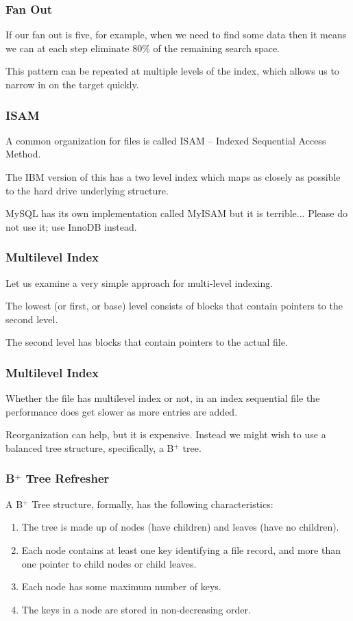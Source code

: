 \begin{frame}
\frametitle{Fan Out}

If our fan out is five, for example, when we need to find some data then it means we can at each step eliminate 80\% of the remaining search space.

This pattern can be repeated at multiple levels of the index, which allows us to narrow in on the target quickly.

\end{frame}

\begin{frame}
\frametitle{ISAM}

A common organization for files is called ISAM -- Indexed Sequential Access Method. 

The IBM version of this has a two level index which maps as closely as possible to the hard drive underlying structure. 

MySQL has its own implementation called MyISAM but it is terrible... Please do not use it; use InnoDB instead. 

\end{frame}

\begin{frame}
\frametitle{Multilevel Index}
Let us examine a very simple approach for multi-level indexing. 

The lowest (or first, or base) level consists of blocks that contain pointers to the second level. 

The second level has blocks that contain pointers to the actual file. 


\end{frame}

\begin{frame}
\frametitle{Multilevel Index}
Whether the file has multilevel index or not, in an index sequential file the performance does get slower as more entries are added. 

Reorganization can help, but it is expensive. Instead we might wish to use a balanced tree structure, specifically, a B$^{+}$ tree.


\end{frame}

\begin{frame}
\frametitle{B$^{+}$ Tree Refresher}

A B$^{+}$ Tree structure, formally, has the following characteristics:

\begin{enumerate}
	\item The tree is made up of nodes (have children) and leaves (have no children).
	\item Each node contains at least one key identifying a file record, and more than one pointer to child nodes or child leaves.
	\item Each node has some maximum number of keys.
	\item The keys in a node are stored in non-decreasing order.
\end{enumerate}

\end{frame}

